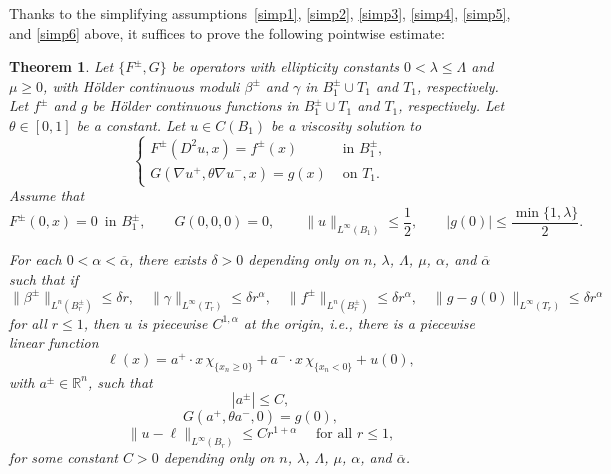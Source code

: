 \documentclass[letter,11pt]{amsart}
\newcommand{\R}{\mathbb{R}}
\newcommand{\chara}[1]{\chi_{#1}}
\newtheorem{thm}{Theorem}[section]
\theoremstyle{definition}
\numberwithin{equation}{section}
\begin{document}
\medskip

Thanks to the simplifying assumptions~\eqref{simp1}, \eqref{simp2}, \eqref{simp3}, \eqref{simp4}, \eqref{simp5}, and \eqref{simp6} above, 
it suffices to prove the following pointwise estimate:

\begin{thm}
Let $\{F^{\pm}, G\}$ be operators with ellipticity constants $0 < \lambda \leq \Lambda$ and $\mu \geq 0$,
with H\"{o}lder continuous moduli $\beta^{\pm}$ and $\gamma$ in $B_1^{\pm} \cup T_1$ and $T_1$, respectively.
Let $f^{\pm}$ and $g$ be H\"{o}lder continuous functions in $B_1^{\pm} \cup T_1$ and $T_1$, respectively.
Let $\theta \in [0,1]$ be a constant.
Let $u \in C(B_1)$ be a viscosity solution to 
\[
\begin{cases}
F^{\pm}(D^2 u, x) = f^{\pm}(x) & \text{ in } B_{1}^{\pm},\\
G(\nabla u^{+}, \theta \nabla u^{-}, x) = g(x) &\text{ on } T_{1}.
\end{cases}
\]
Assume that 
\begin{equation}
\label{ue1}
F^{\pm}(0, x) = 0 \, \text{ in } B_1^{\pm}, \qquad G(0,0, 0) = 0, \qquad \|u\|_{L^{\infty}(B_1)} \leq \frac{1}{2}, \qquad |g(0)| \leq \frac{\min\{1,\lambda\}}{2}.
\end{equation}

For each $0 < \alpha < \overline{\alpha}$, there exists $\delta > 0$ depending only on $n$, $\lambda$, $\Lambda$, $\mu$, $\alpha$, and $\overline{\alpha}$ such that if
\begin{equation}
\label{ue2}
\|\beta^{\pm}\|_{L^n(B_r^{\pm})} \leq \delta r,
\quad 
\|\gamma\|_{L^{\infty}(T_r)} \leq \delta r^{\alpha},
\quad
\|f^{\pm}\|_{L^n(B_r^{\pm})} \leq \delta r^{\alpha},
\quad
\|g- g(0)\|_{L^{\infty}(T_r)} \leq \delta r^{\alpha}
\end{equation}
for all $r \leq 1$,
then $u$ is piecewise $C^{1,\alpha}$ at the origin, i.e., there is a piecewise linear function
\[
\ell(x) = a^{+} \cdot x \, \chara{\{x_n \geq 0\}} + a^{-} \cdot x \, \chara{\{x_n < 0\}} + u(0),
\]
with $a^{\pm} \in \R^n$, such that
\[
|a^{\pm}| \leq C,
\]
\[
G(a^{+}, \theta a^{-}, 0) = g(0),
\]
\[
\|u - \ell\|_{L^{\infty}(B_r)} \leq 
Cr^{1 +\alpha}
\quad \text{ for all } r \leq 1,
\]
for some constant $C > 0$ depending only on $n$, $\lambda$, $\Lambda$, $\mu$, $\alpha$, and $\overline{\alpha}$.
\end{thm}
\end{document}
